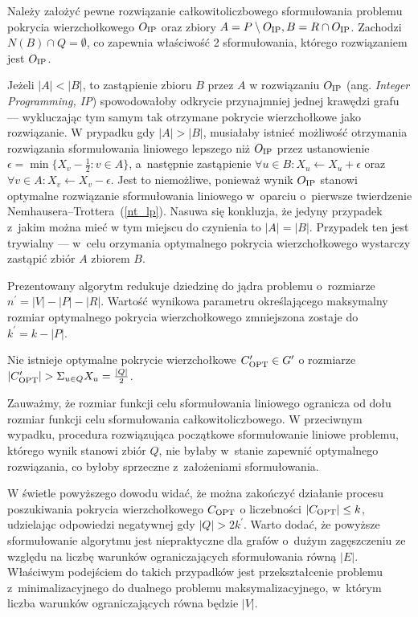 \begin{bproof}
  Należy założyć pewne rozwiązanie całkowitoliczbowego sformułowania problemu 
  pokrycia wierzchołkowego $O_{\textnormal{IP}}$ oraz zbiory 
  ${A = P \setminus O_{\textnormal{IP}}, B = R \cap O_{\textnormal{IP}}}$.
  Zachodzi $N(B) \cap Q = \emptyset$, co zapewnia właściwość 2 sformułowania, którego rozwiązaniem jest $O_{\textnormal{IP}}$.

  Jeżeli $|A|<|B|$, to zastąpienie zbioru $B$ przez $A$ w rozwiązaniu $O_{\textnormal{IP}}$ (ang. \emph{Integer Programming, IP}) spowodowałoby odkrycie przynajmniej jednej krawędzi grafu --- wykluczając tym samym tak otrzymane pokrycie wierzchołkowe jako rozwiązanie.
  W prypadku gdy $|A|>|B|$, musiałaby istnieć możliwość otrzymania rozwiązania sformułowania liniowego lepszego niż $O_{\textnormal{IP}}$ przez ustanowienie $\epsilon = \min\{X_v-\frac{1}{2}: v \in A\}$, a~następnie
  zastąpienie $\forall{u \in B}:X_u \leftarrow X_u + \epsilon$ oraz $\forall{v \in A}: X_v \leftarrow X_v -\epsilon$.
  Jest to niemożliwe, ponieważ wynik $O_{\textnormal{IP}}$ stanowi optymalne rozwiązanie sformułowania liniowego w~oparciu o~pierwsze twierdzenie Nemhausera--Trottera~(\ref{nt_lp}).
  Nasuwa się konkluzja, że jedyny przypadek z~jakim można mieć w tym miejscu do czynienia to $|A|=|B|$.
  Przypadek ten jest trywialny --- w~celu orzymania optymalnego pokrycia wierzchołkowego wystarczy zastąpić zbiór $A$ zbiorem $B$.
\end{bproof}
Prezentowany algorytm redukuje dziedzinę do jądra problemu o~rozmiarze $n^\prime=|V|-|P|-|R|$.
Wartość wynikowa parametru określającego maksymalny rozmiar optymalnego pokrycia wierzchołkowego zmniejszona zostaje do $k^\prime=k-|P|$.
\begin{theorem}
  Nie istnieje optymalne pokrycie wierzchołkowe $C^\prime_{\textnormal{OPT}}\in G^\prime$ o rozmiarze $|C^\prime_{\textnormal{OPT}}|>\Sigma_{u\in Q}X_u=\frac{|Q|}{2}$.
\end{theorem}
\begin{bproof}
  Zauważmy, że rozmiar funkcji celu sformułowania liniowego ogranicza od dołu rozmiar funkcji celu sformułowania całkowitoliczbowego.
  W przeciwnym wypadku, procedura rozwiązująca początkowe sformułowanie liniowe problemu, którego wynik stanowi zbiór $Q$, nie byłaby w~stanie zapewnić optymalnego rozwiązania, co byłoby sprzeczne z~założeniami sformułowania.
\end{bproof}
\par{
  W świetle powyższego dowodu widać, że można zakończyć działanie procesu poszukiwania pokrycia wierzchołkowego $C_{\textnormal{OPT}}$ o liczebności $|C_{\textnormal{OPT}}|\leq k$, udzielając odpowiedzi negatywnej gdy $|Q|>2k^\prime$.
  Warto dodać, że powyższe sformułowanie algorytmu jest niepraktyczne dla grafów o~dużym zagęszczeniu ze względu na liczbę warunków ograniczających sformułowania równą $|E|$.
  Właściwym podejściem do takich przypadków jest przekształcenie problemu z~minimalizacyjnego do dualnego problemu maksymalizacyjnego, w~którym liczba warunków ograniczających równa będzie $|V|$.
}
